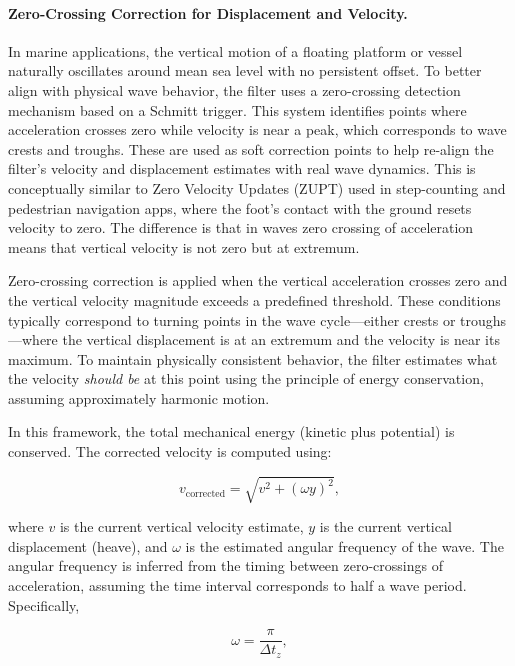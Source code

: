 \documentclass[11pt,letterpaper]{article}
\begin{document}
\paragraph{Zero-Crossing Correction for Displacement and Velocity.}
In marine applications, the vertical motion of a floating platform or vessel naturally oscillates around mean sea level with no persistent offset. To better align with physical wave behavior, the filter uses a zero-crossing detection mechanism based on a Schmitt trigger. This system identifies points where acceleration crosses zero while velocity is near a peak, which corresponds to wave crests and troughs. These are used as soft correction points\cite{simon2006optimal} to help re-align the filter’s velocity and displacement estimates with real wave dynamics. This is conceptually similar to Zero Velocity Updates (ZUPT) used in step-counting and pedestrian navigation apps, where the foot’s contact with the ground resets velocity to zero. The difference is that in waves zero crossing of acceleration means that vertical velocity is not zero but at extremum.

Zero-crossing correction is applied when the vertical acceleration crosses zero and the vertical velocity magnitude exceeds a predefined threshold. These conditions typically correspond to turning points in the wave cycle—either crests or troughs—where the vertical displacement is at an extremum and the velocity is near its maximum. To maintain physically consistent behavior, the filter estimates what the velocity \emph{should be} at this point using the principle of energy conservation, assuming approximately harmonic motion.

In this framework, the total mechanical energy (kinetic plus potential) is conserved. The corrected velocity is computed using:

\begin{equation}
v_{\text{corrected}} = \sqrt{v^2 + (\omega y)^2},
\end{equation}

where \( v \) is the current vertical velocity estimate, \( y \) is the current vertical displacement (heave), and \( \omega \) is the estimated angular frequency of the wave. The angular frequency is inferred from the timing between zero-crossings of acceleration, assuming the time interval corresponds to half a wave period. Specifically,

\begin{equation}
\omega = \frac{\pi}{\Delta t_{z}},
\end{equation}
\end{document}

